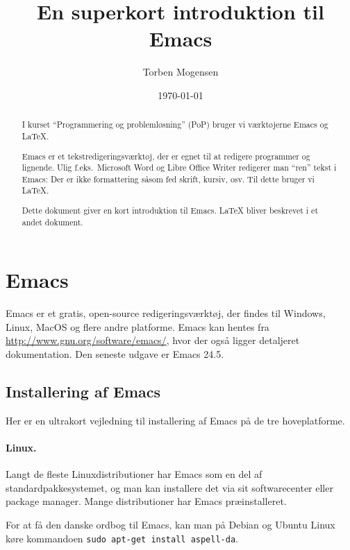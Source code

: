 \documentclass[a4paper]{article}
\begin{document}
\title{En superkort introduktion til Emacs}

\author{Torben Mogensen}
\date{\today}

\maketitle

\begin{abstract}
I kurset ``Programmering og problemløsning'' (PoP) bruger vi
værktøjerne Emacs og \LaTeX.

Emacs er et tekstredigeringsværktøj, der er egnet til at redigere
programmer og lignende.  Ulig f.eks.\ Microsoft Word og Libre Office
Writer redigerer man ``ren'' tekst i Emacs: Der er ikke formattering
såsom fed skrift, kursiv, osv.  Til dette bruger vi \LaTeX.

Dette dokument giver en kort introduktion til Emacs.  \LaTeX{} bliver
beskrevet i et andet dokument.
\end{abstract}

\tableofcontents


\section{Emacs}

Emacs er et gratis, open-source redigeringsværktøj, der findes til
Windows, Linux, MacOS og flere andre platforme.  Emacs kan hentes fra
\url{http://www.gnu.org/software/emacs/}, hvor der også ligger
detaljeret dokumentation.  Den seneste udgave er Emacs 24.5.

\subsection{Installering af Emacs}

Her er en ultrakort vejledning til installering af Emacs på de tre
hoveplatforme.

\paragraph{Linux.}

Langt de fleste Linuxdistributioner har Emacs som en del af
standardpakkesystemet, og man kan installere det via sit
softwarecenter eller package manager.  Mange distributioner har Emacs
præinstalleret.

For at få den danske ordbog til Emacs, kan man på Debian og Ubuntu
Linux køre kommandoen \texttt{sudo~apt-get~install~aspell-da}.
\end{document}
